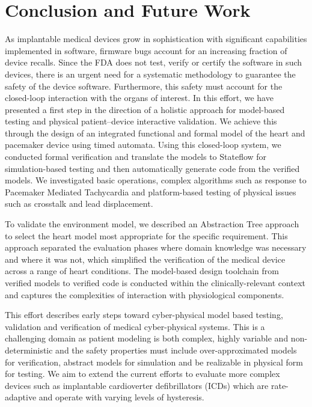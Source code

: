 \chapter{Conclusion and Future Work}
As implantable medical devices grow in sophistication with significant capabilities implemented in software, firmware bugs account for an increasing fraction of device recalls. Since the FDA  does not test, verify or certify the software in such devices, there is an urgent need for a systematic methodology to guarantee the safety of the device software. Furthermore, this safety must account for the closed-loop interaction with the organs of interest. In this effort, we have presented a first step in the direction of a holistic approach for model-based testing and physical patient--device interactive validation. We achieve this through the design of an integrated functional and formal model of the heart and pacemaker device using timed automata. Using this closed-loop system, we conducted formal verification and translate the models to Stateflow for simulation-based testing and then automatically generate code from the verified models. We investigated basic operations, complex algorithms such as response to Pacemaker Mediated Tachycardia and platform-based testing of physical issues such as crosstalk and lead displacement. 

To validate the environment model, we described an Abstraction Tree approach to select the heart model most appropriate for the specific requirement. This approach separated the evaluation phases where domain knowledge was necessary and where it was not, which simplified the verification of the medical device across a range of heart conditions. The model-based design toolchain from verified models to verified code is conducted within the clinically-relevant context and captures the complexities of interaction with physiological components. 

This effort describes early steps toward cyber-physical model based testing, validation and verification of medical cyber-physical systems. This is a challenging domain as patient modeling is both complex, highly variable and non-deterministic and the safety properties must include over-approximated models for verification, abstract models for simulation and be realizable in physical form for testing. We aim to extend the current efforts to evaluate more complex devices such as implantable cardioverter defibrillators (ICDs) which are rate-adaptive and operate with varying levels of hysteresis. 

